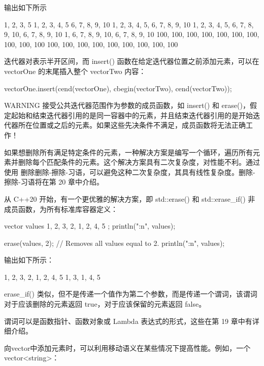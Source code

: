输出如下所示

\begin{shell}
1, 2, 3, 5
1, 2, 3, 4, 5
6, 7, 8, 9, 10
1, 2, 3, 4, 5, 6, 7, 8, 9, 10
1, 2, 3, 4, 5, 6, 7, 8, 9, 10, 6, 7, 8, 9, 10
1, 6, 7, 8, 9, 10, 6, 7, 8, 9, 10
100, 100, 100, 100, 100, 100, 100, 100, 100, 100
100, 100, 100, 100, 100, 100, 100, 100, 100
\end{shell}

迭代器对表示半开区间，而 insert() 函数在给定迭代器位置之前添加元素，可以在 vectorOne 的末尾插入整个 vectorTwo 内容：

\begin{cpp}
vectorOne.insert(cend(vectorOne), cbegin(vectorTwo), cend(vectorTwo));
\end{cpp}

\begin{myWarning}{WARNING}
接受公共迭代器范围作为参数的成员函数，如 insert() 和 erase()，假定起始和结束迭代器引用的是同一容器中的元素，并且结束迭代器引用的是开始迭代器所在位置或之后的元素。如果这些先决条件不满足，成员函数将无法正确工作！
\end{myWarning}

如果想删除所有满足特定条件的元素，一种解决方案是编写一个循环，遍历所有元素并删除每个匹配条件的元素。这个解决方案具有二次复杂度，对性能不利。通过使用 删除删除-擦除-习语，可以避免这种二次复杂度，其具有线性复杂度。删除-擦除-习语将在第 20 章中介绍。

从 C++20 开始，有一个更优雅的解决方案，即 std::erase() 和 std::erase\_if() 非成员函数，为所有标准库容器定义：

\begin{cpp}
vector values { 1, 2, 3, 2, 1, 2, 4, 5 };
println("{:n}", values);

erase(values, 2); // Removes all values equal to 2.
println("{:n}", values);
\end{cpp}

输出如下所示：

\begin{shell}
1, 2, 3, 2, 1, 2, 4, 5
1, 3, 1, 4, 5
\end{shell}

erase\_if() 类似，但不是传递一个值作为第二个参数，而是传递一个谓词，该谓词对于应该删除的元素返回 true，对于应该保留的元素返回 false。

谓词可以是函数指针、函数对象或 Lambda 表达式的形式，这些在第 19 章中有详细介绍。


向vector中添加元素时，可以利用移动语义在某些情况下提高性能。例如，一个vector<string>：

